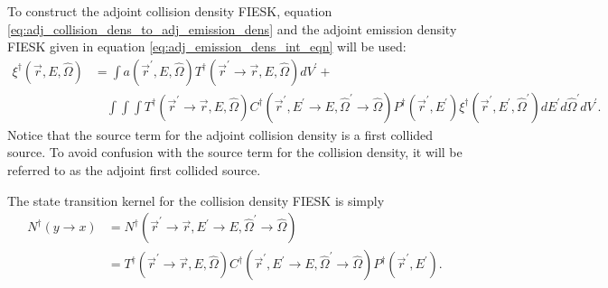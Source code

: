 To construct the adjoint collision density FIESK, equation 
\ref{eq:adj_collision_dens_to_adj_emission_dens} and the adjoint emission
density FIESK given in equation \ref{eq:adj_emission_dens_int_eqn} will be
used:
\begin{align}
  \xi^{\dagger}(\vec{r},E,\hat{\Omega}) & = \int a(\vec{r}^{'},E,\hat{\Omega})
  T^{\dagger}(\vec{r}^{'} \to \vec{r},E,\hat{\Omega}) dV^{'} + \nonumber \\
  &\quad \int\int\int T^{\dagger}(\vec{r}^{'} \to \vec{r},E,\hat{\Omega})
  C^{\dagger}(\vec{r}^{'},E^{'} \to E, \hat{\Omega}^{'} \to \hat{\Omega})
  P^{\dagger}(\vec{r}^{'},E^{'}) \xi^{\dagger}(\vec{r}^{'},E^{'},\hat{\Omega}^{'})
  dE^{'}d\hat{\Omega}^{'}dV^{'}.
  \label{eq:adj_collision_dens_int_eqn}
\end{align}
Notice that the source term for the adjoint collision density is a first
collided source. To avoid confusion with the source term for the collision
density, it will be referred to as the adjoint first collided source.

The state transition kernel for the collision density FIESK is simply
\begin{align}
  N^{\dagger}(y \to x) & =
  N^{\dagger}(\vec{r}^{'} \to \vec{r},E^{'} \to E,\hat{\Omega}^{'} \to \hat{\Omega})
  \nonumber \\
  & = T^{\dagger}(\vec{r}^{'} \to \vec{r},E,\hat{\Omega})
  C^{\dagger}(\vec{r}^{'},E^{'} \to E,\hat{\Omega}^{'} \to \hat{\Omega})
  P^{\dagger}(\vec{r}^{'},E^{'}).
\end{align}

